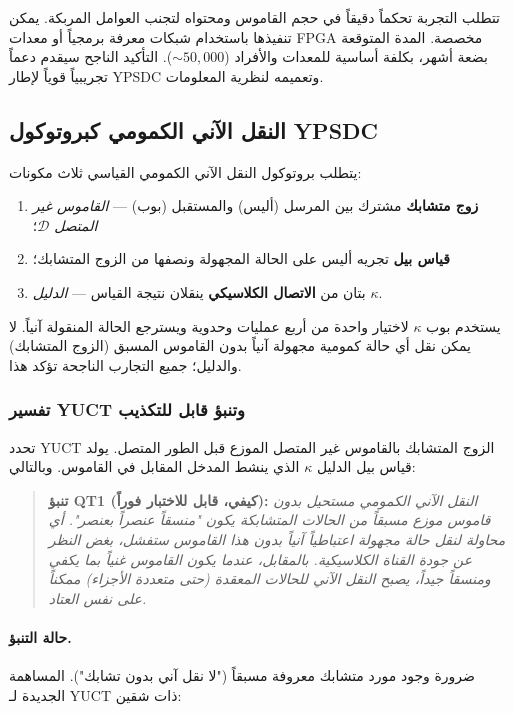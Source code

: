 \documentclass[12pt,a4paper]{article}
\theoremstyle{remark}
\begin{document}
	تتطلب التجربة تحكماً دقيقاً في حجم القاموس ومحتواه لتجنب العوامل المربكة. يمكن تنفيذها باستخدام شبكات معرفة برمجياً أو معدات FPGA مخصصة. المدة المتوقعة بضعة أشهر، بكلفة أساسية للمعدات والأفراد (\(\sim 50,000\)). التأكيد الناجح سيقدم دعماً تجريبياً قوياً لإطار YPSDC وتعميمه لنظرية المعلومات.
	
	\subsection{النقل الآني الكمومي كبروتوكول YPSDC}
	\label{subsec:qt}
	
	يتطلب بروتوكول النقل الآني الكمومي القياسي ثلاث مكونات:
	\begin{enumerate}
		\item \textbf{زوج متشابك} مشترك بين المرسل (أليس) والمستقبل (بوب) — \emph{القاموس غير المتصل} \(\mathcal{D}\)؛
		\item \textbf{قياس بيل} تجريه أليس على الحالة المجهولة ونصفها من الزوج المتشابك؛
		\item بتان من \textbf{الاتصال الكلاسيكي} ينقلان نتيجة القياس — \emph{الدليل} \(\kappa\).
	\end{enumerate}
	يستخدم بوب \(\kappa\) لاختيار واحدة من أربع عمليات وحدوية ويسترجع الحالة المنقولة آنياً. لا يمكن نقل أي حالة كمومية مجهولة آنياً بدون القاموس المسبق (الزوج المتشابك) والدليل؛ جميع التجارب الناجحة تؤكد هذا.
	
	\subsubsection{تفسير YUCT وتنبؤ قابل للتكذيب}
	
	تحدد YUCT الزوج المتشابك بالقاموس غير المتصل الموزع قبل الطور المتصل. يولد قياس بيل الدليل \(\kappa\) الذي ينشط المدخل المقابل في القاموس. وبالتالي:
	
	\begin{quote}
		\textbf{تنبؤ QT1 (كيفي، قابل للاختبار فوراً):}
		\emph{النقل الآني الكمومي مستحيل بدون قاموس موزع مسبقاً من الحالات المتشابكة يكون "منسقاً عنصراً بعنصر". أي محاولة لنقل حالة مجهولة اعتباطياً آنياً بدون هذا القاموس ستفشل، بغض النظر عن جودة القناة الكلاسيكية. بالمقابل، عندما يكون القاموس غنياً بما يكفي ومنسقاً جيداً، يصبح النقل الآني للحالات المعقدة (حتى متعددة الأجزاء) ممكناً على نفس العتاد.}
	\end{quote}
	
	\paragraph{حالة التنبؤ.}
	ضرورة وجود مورد متشابك معروفة مسبقاً ("لا نقل آني بدون تشابك"). المساهمة الجديدة لـ YUCT ذات شقين:
	
\end{document}
